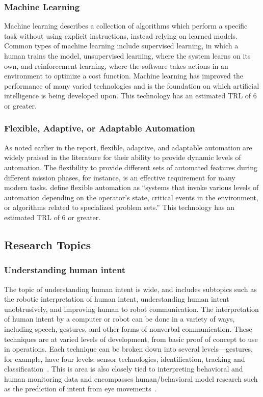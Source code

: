 \subsubsection{Machine Learning}
Machine learning describes a collection of algorithms which perform a specific task without using explicit instructions, instead relying on learned models.
Common types of machine learning include supervised learning, in which a human trains the model, unsupervised learning, where the system learns on its own, and reinforcement learning, where the software takes actions in an environment to optimize a cost function.
Machine learning has improved the performance of many varied technologies and is the foundation on which artificial intelligence is being developed upon.
This technology has an estimated TRL of 6 or greater.

\subsubsection{Flexible, Adaptive, or Adaptable Automation}
As noted earlier in the report, flexible, adaptive, and adaptable automation are widely praised in the literature for their ability to provide dynamic levels of automation.
The flexibility to provide different sets of automated features during different mission phases, for instance, is an effective requirement for many modern tasks.
\citeauthor{chen_humanagent_2014} define flexible automation as ``systems that invoke various levels of automation depending on the operator's state, critical events in the environment, or algorithms related to specialized problem sets.''
This technology has an estimated TRL of 6 or greater.

\subsection{Research Topics}
\subsubsection{Understanding human intent}
The topic of understanding human intent is wide, and includes subtopics such as the robotic interpretation of human intent, understanding human intent unobtrusively, and improving human to robot communication.
The interpretation of human intent by a computer or robot can be done in a variety of ways, including speech, gestures, and other forms of nonverbal communication.
These techniques are at varied levels of development, from basic proof of concept to use in operations.
Each technique can be broken down into several levels—gestures, for example, have four levels: sensor technologies, identification, tracking and classification~\citep{liu_gesture_2018}.
This is area is also closely tied to interpreting behavioral and human monitoring data and encompasses human/behavioral model research such as the prediction of intent from eye movements~\citep{Singh:2018:CPG:3237383.3237457, ruhland_review_2015}.

